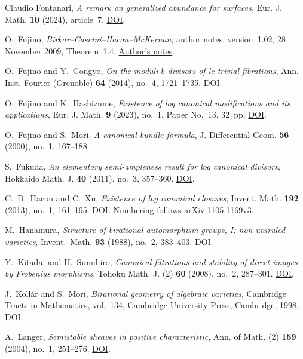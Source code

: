 Claudio Fontanari,
\emph{A remark on generalized abundance for surfaces},
Eur. J. Math. \textbf{10} (2024), article~7.
\href{https://doi.org/10.1007/s40879-023-00716-y}{DOI}.

O.~Fujino,
\emph{Birkar--Cascini--Hacon--McKernan},
author notes, version~1.02, 28 November 2009, Theorem~1.4.
\href{https://www.math.kyoto-u.ac.jp/~fujino/BCHM01.pdf}{Author's notes}.

O.~Fujino and Y.~Gongyo,
\emph{On the moduli $b$-divisors of lc-trivial fibrations},
Ann. Inst. Fourier (Grenoble) \textbf{64} (2014), no.~4, 1721--1735.
\href{https://doi.org/10.5802/aif.2894}{DOI}.

O.~Fujino and K.~Hashizume,
\emph{Existence of log canonical modifications and its applications},
Eur. J. Math. \textbf{9} (2023), no.~1, Paper No.~13, 32~pp.
\href{https://doi.org/10.1007/s40879-023-00598-0}{DOI}.

O.~Fujino and S.~Mori,
\emph{A canonical bundle formula},
J. Differential Geom. \textbf{56} (2000), no.~1, 167--188.

S.~Fukuda,
\emph{An elementary semi-ampleness result for log canonical divisors},
Hokkaido Math. J. \textbf{40} (2011), no.~3, 357--360.
\href{https://doi.org/10.14492/hokmj/1319595860}{DOI}.

C.~D.~Hacon and C.~Xu,
\emph{Existence of log canonical closures},
Invent. Math. \textbf{192} (2013), no.~1, 161--195.
\href{https://doi.org/10.1007/s00222-012-0409-0}{DOI}.
Numbering follows arXiv:1105.1169v3.

M.~Hanamura,
\emph{Structure of birational automorphism groups, I: non-uniruled varieties},
Invent.~Math. \textbf{93} (1988), no.~2, 383--403.
\href{https://doi.org/10.1007/BF01394338}{DOI}.

Y.~Kitadai and H.~Sumihiro,
\emph{Canonical filtrations and stability of direct images by Frobenius morphisms},
Tohoku Math. J. (2) \textbf{60} (2008), no.~2, 287--301.
\href{https://doi.org/10.2748/tmj/1215442876}{DOI}.

J.~Koll\'ar and S.~Mori,
\emph{Birational geometry of algebraic varieties},
Cambridge Tracts in Mathematics, vol.~134,
Cambridge University Press, Cambridge, 1998.
\href{https://doi.org/10.1017/CBO9780511662560}{DOI}.

A.~Langer,
\emph{Semistable sheaves in positive characteristic},
Ann. of Math. (2) \textbf{159} (2004), no.~1, 251--276.
\href{https://doi.org/10.4007/annals.2004.159.251}{DOI}.

